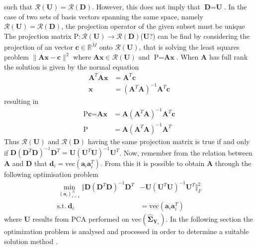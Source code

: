  such that $\mathcal{R}(\textbf{U})=\mathcal{R}(\textbf{D})$. 
However, this does not imply that $\textbf{D}=\textbf{U}$. 
In the case of two sets of basis vectors spanning the same space, namely $\mathcal{R}(\textbf{U})=\mathcal{R}(\textbf{D})$, the projection operator of the given subset must be unique  
The projection matrix $\text{P}:\mathcal{R}(\textbf{U})\rightarrow \mathcal{R}(\textbf{D})$($\textbf{U}$?) can be find by considering the projection of an vector $\textbf{c}\in \mathbb{R}^{\widetilde{M}}$ onto $\mathcal{R}(\textbf{U})$, that is solving the least squares problem $\| \textbf{Ax}-\textbf{c}\|^{2}$ where $\textbf{Ax}\in \mathcal{R}(\textbf{U})$ and $\text{P} = \textbf{Ax}$. When $\textbf{A}$ has full rank the solution is given by the normal equation
\begin{align*}
\textbf{A}^T\textbf{A}\textbf{x} &= \textbf{A}^T\textbf{c}\\
\textbf{x} &= (\textbf{A}^T\textbf{A})^{-1}\textbf{A}^T\textbf{c}
\end{align*}	
resulting in
\begin{align*}
\text{P}\textbf{c} = \textbf{Ax} &= \textbf{A}(\textbf{A}^T\textbf{A})^{-1}\textbf{A}^T\textbf{c}\\
\text{P} &= \textbf{A}(\textbf{A}^T\textbf{A})^{-1}\textbf{A}^T 
\end{align*} 
Thus $\mathcal{R}(\textbf{U})$ and $\mathcal{R}(\textbf{D})$ having the same projection matrix is true if and only if $\textbf{D}(\textbf{D}^T\textbf{D})^{-1}\textbf{D}^T=\textbf{U}(\textbf{U}^T\textbf{U})^{-1}\textbf{U}^T$. 
Now, remember from the relation between $\textbf{A}$ and $\textbf{D}$ that $\textbf{d}_i = \text{vec}(\textbf{a}_i\textbf{a}_i^T)$. 
From this it is possible to obtain $\textbf{A}$ through the following optimisation problem 
\begin{align}
\min_{\left\{\textbf{a}_i\right\}_{i = 1}^{N}}\Vert  \textbf{D}(\textbf{D}^T\textbf{D})^{-1}\textbf{D}^T &- \textbf{U}(\textbf{U}^T\textbf{U})^{-1}\textbf{U}^T \Vert_{F}^{2} \nonumber \\
\text{s.t.} \ \textbf{d}_i&=\text{vec}(\textbf{a}_i\textbf{a}_i^T)\label{eq:Cov_DL2}
\end{align}      
where $\textbf{U}$ results from PCA performed on $\text{vec}(\widehat{\boldsymbol{\Sigma}}_{\textbf{Y}_s})$.
In the following section the optimization problem is analysed and processed in order to determine a suitable solution method . 

